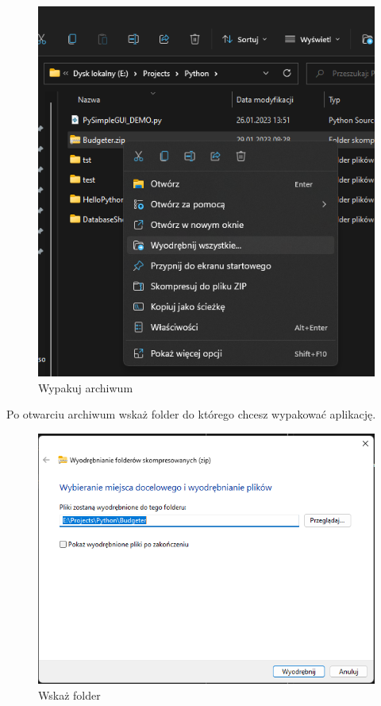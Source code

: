 \documentclass[a4paper,10pt, twoside]{report}
\begin{document}
\begin{figure}[H]           %
    \caption{Wypakuj archiwum}
    \label{fig:Wypakuj archiwum}
    \centering
    \includegraphics[width=12cm]{figures/Guide/Righten_Instruction_01_unzip-archive.png}
\end{figure}

{Po otwarciu archiwum wskaż folder do którego chcesz wypakować aplikację.}

\begin{figure}[H]           %
    \caption{Wskaż folder}
    \label{fig:Wskaż folder}
    \centering
    \includegraphics[width=12cm]{figures/Guide/Righten_Instruction_01_unzip-archive_p2.png}
\end{figure}
\end{document}
